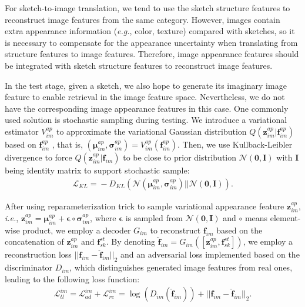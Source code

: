 \documentclass[10pt,twocolumn,letterpaper]{article}
\begin{document}
For sketch-to-image translation, we tend to use the sketch structure features to reconstruct image features from the same category. 
However, images contain extra appearance information (\emph{e.g.}, color, texture) compared with sketches, so it is necessary to compensate for the appearance uncertainty when translating from structure features to image features. 
Therefore, image appearance features should be integrated with sketch structure features to reconstruct image features. 

In the test stage, given a sketch, we also hope to generate its imaginary image feature to enable retrieval in the image feature space. Nevertheless, we do not have the corresponding image appearance features in this case. One commonly used solution is stochastic sampling during testing. We introduce a variational estimator $V_{im}^{ap}$ to approximate the variational Gaussian distribution $Q(\mathbf{z}_{im}^{ap}|\mathbf{f}_{im}^{ap})$ based on $\mathbf{f}_{im}^{ap}$ , that is, $(\bm{\mu}_{im}^{ap}, \bm{\sigma}_{im}^{ap})= V_{im}^{ap}(\mathbf{f}_{im}^{ap})$. Then, we use Kullback-Leibler divergence to force  $Q(\mathbf{z}_{im}^{ap}|\mathbf{f}_{im})$ to be close to prior distribution $\mathcal{N}(\mathbf{0}, \mathbf{I})$  with $\mathbf{I}$ being identity matrix to support stochastic sample:
\vspace{-4pt}
\begin{align}
    \mathcal{L}_{KL} = \!-\!D_{KL}(\mathcal{N}(\bm{\mu}_{im}^{ap}, \bm{\sigma}_{im}^{ap}) || \mathcal{N}(\mathbf{0}, \mathbf{I})).
\end{align}

After using reparameterization trick \cite{kingma2013auto} to sample variational appearance feature  $\mathbf{z}_{im}^{ap}$, \emph{i.e.}, $\mathbf{z}_{im}^{ap}=\bm{\mu}_{im}^{ap}+\bm{\epsilon}\circ \bm{\sigma}_{im}^{ap}$, where $\bm{\epsilon}$ is sampled from $\mathcal{N}(\mathbf{0}, \mathbf{I})$ and $\circ$ means element-wise product, we employ a decoder $G_{im}$ to reconstruct $\mathbf{f}_{im}$ based on the concatenation of $\mathbf{z}_{im}^{ap}$ and $\mathbf{f}_{sk}^{st}$.  
By denoting $\hat{\mathbf{f}}_{im} = G_{im}([\mathbf{z}_{im}^{ap}, \mathbf{f}_{sk}^{st}])$, we employ a reconstruction loss $||\mathbf{f}_{im}\!-\!\hat{\mathbf{f}}_{im}||_2$ and an adversarial loss implemented based on the discriminator $D_{im}$, which distinguishes generated image features from real ones, leading to the following loss function:
\vspace{-4pt}
\begin{align} \label{eqn:7}
    \mathcal{L}_{tl}^{im}\!=\!\mathcal{L}_{ad}^{im}\!+\!\mathcal{L}_{re}^{im} \!=\!\log(D_{im}(\hat{\mathbf{f}}_{im})) \!+\! ||\mathbf{f}_{im}\!-\!\hat{\mathbf{f}}_{im}||_2.
\end{align}
\end{document}
